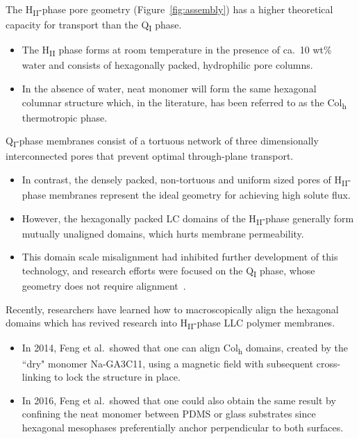\documentclass{article}
\begin{document}
  The H\textsubscript{II}-phase pore geometry (Figure~\ref{fig:assembly}) has a
  higher theoretical capacity for transport than the Q\textsubscript{I} phase.
  \begin{itemize}
	  \item The H\textsubscript{II} phase forms at room temperature in the 
	  presence of ca.~10 wt\% water and consists of hexagonally packed, 
	  hydrophilic pore columns\cite{smith_ordered_1997}. 
	  \item In the absence of water, neat monomer will form the same hexagonal
	  columnar structure which, in the literature, has been referred to as the
	  Col\textsubscript{h} thermotropic phase\cite{feng_scalable_2014}.
  \end{itemize}

  Q\textsubscript{I}-phase membranes consist of a tortuous network of three
  dimensionally interconnected pores that prevent optimal through-plane
  transport. 
  \begin{itemize}
    \item In contrast, the densely packed, non-tortuous and uniform sized
    pores of H\textsubscript{II}-phase membranes represent the ideal geometry
    for achieving high solute flux\cite{matyka_tortuosity-porosity_2008}.  
    \item However, the hexagonally packed LC domains of the H\textsubscript{II}-phase
    generally form mutually unaligned domains, which hurts membrane permeability. 
    \item This domain scale misalignment had inhibited further development of 
    this technology, and research efforts were focused on the Q\textsubscript{I}
    phase, whose geometry does not require alignment~\cite{zhou_new_2007}.
  \end{itemize}

  Recently, researchers have learned how to macroscopically align the
  hexagonal domains which has revived research into H\textsubscript{II}-phase LLC
  polymer membranes. 
  \begin{itemize}
    \item In 2014, Feng et al.~showed that one can align Col\textsubscript{h}
    domains, created by the ``dry" monomer Na-GA3C11, using a magnetic field
	with subsequent cross-linking to lock the structure in place\cite{feng_scalable_2014}.
	\item In 2016, Feng et al.~showed that one could also obtain the same result
	by confining the neat monomer between PDMS or glass substrates since hexagonal
	mesophases preferentially anchor perpendicular to both surfaces\cite{feng_thin_2016}.
  \end{itemize}
  
\end{document}
